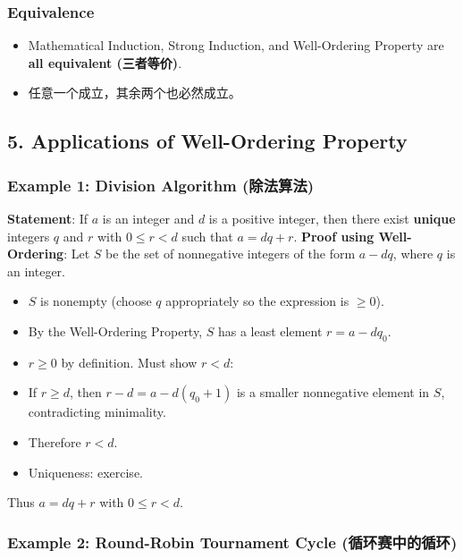 \documentclass[10pt,a4paper,openany]{ctexbook}
\theoremstyle{definition}
\theoremstyle{remark}
\begin{document}
\subsubsection{Equivalence}

\begin{itemize}
\item Mathematical Induction, Strong Induction, and Well-Ordering Property are \textbf{all equivalent (三者等价)}.
\item 任意一个成立，其余两个也必然成立。

\end{itemize}

\vspace{-2pt}

\subsection{5. Applications of Well-Ordering Property}

\subsubsection{Example 1: Division Algorithm (除法算法)}

\textbf{Statement}: If $a$ is an integer and $d$ is a positive integer, then there exist \textbf{unique} integers $q$ and $r$ with $0 \le r < d$ such that $a = dq + r$.
\textbf{Proof using Well-Ordering}:
Let $S$ be the set of nonnegative integers of the form $a - dq$, where $q$ is an integer.
\begin{itemize}
\item $S$ is nonempty (choose $q$ appropriately so the expression is $\ge 0$).
\item By the Well-Ordering Property, $S$ has a least element $r = a - dq_0$.
\item $r \ge 0$ by definition. Must show $r < d$:
\item If $r \ge d$, then $r - d = a - d(q_0+1)$ is a smaller nonnegative element in $S$, contradicting minimality.
\item Therefore $r < d$.
\item Uniqueness: exercise.

\end{itemize}

Thus $a = dq + r$ with $0 \le r < d$.
\vspace{-2pt}

\subsubsection{Example 2: Round-Robin Tournament Cycle (循环赛中的循环)}
\end{document}

